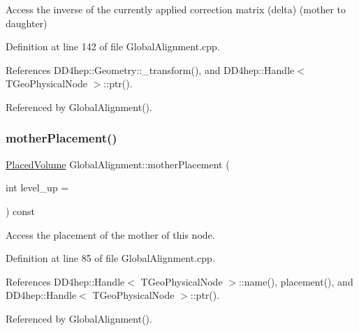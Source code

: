 Access the inverse of the currently applied correction matrix (delta) (mother to daughter) 



Definition at line 142 of file Global\+Alignment.\+cpp.



References D\+D4hep\+::\+Geometry\+::\+\_\+transform(), and D\+D4hep\+::\+Handle$<$ T\+Geo\+Physical\+Node $>$\+::ptr().



Referenced by Global\+Alignment().

\hypertarget{class_d_d4hep_1_1_alignments_1_1_global_alignment_a546653105428014c4917ca502dc63e4b}{}\label{class_d_d4hep_1_1_alignments_1_1_global_alignment_a546653105428014c4917ca502dc63e4b} 
\subsubsection{\texorpdfstring{mother\+Placement()}{motherPlacement()}}
{\footnotesize\ttfamily \hyperlink{class_d_d4hep_1_1_geometry_1_1_placed_volume}{Placed\+Volume} Global\+Alignment\+::mother\+Placement (\begin{DoxyParamCaption}\item[{int}]{level\+\_\+up = {} }\end{DoxyParamCaption}) const}



Access the placement of the mother of this node. 



Definition at line 85 of file Global\+Alignment.\+cpp.



References D\+D4hep\+::\+Handle$<$ T\+Geo\+Physical\+Node $>$\+::name(), placement(), and D\+D4hep\+::\+Handle$<$ T\+Geo\+Physical\+Node $>$\+::ptr().



Referenced by Global\+Alignment().

\hypertarget{class_d_d4hep_1_1_alignments_1_1_global_alignment_a26def28356fd35a0f294d58aa615cce4}{}\label{class_d_d4hep_1_1_alignments_1_1_global_alignment_a26def28356fd35a0f294d58aa615cce4} 

